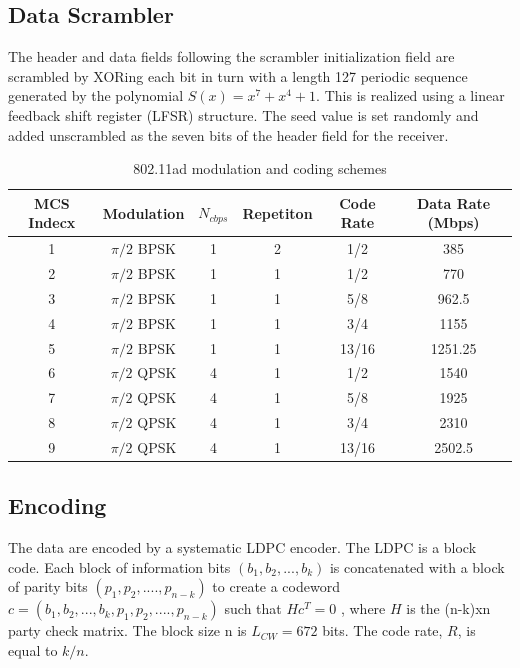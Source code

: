 \documentclass[conference]{IEEEtran}
\begin{document}
\subsection{Data Scrambler} 
The header and data fields following the scrambler initialization field are scrambled by XORing each bit in turn with a length 127 periodic sequence generated by the polynomial
$S ( x ) = x^7 + x^4 + 1$. This is realized using a linear feedback shift register (LFSR) structure. The seed value is set randomly and added unscrambled as the seven bits of the header field for the receiver.
\begin{table}[t]
\normalsize
\caption{802.11ad modulation and coding schemes}
\label{mcs}
\centering
\begin{tabular}{@{}cccccc@{}}
\toprule
MCS Indecx & Modulation & $N_{cbps}$ & Repetiton & Code Rate & Data Rate (Mbps) \\ \midrule
1 & $\pi/2$ BPSK & 1 & 2 & 1/2 & 385 \\
2 & $\pi/2$ BPSK & 1 & 1 & 1/2 & 770 \\
3 & $\pi/2$ BPSK & 1 & 1 & 5/8 & 962.5 \\
4 & $\pi/2$ BPSK & 1 & 1 & 3/4 & 1155 \\
5 & $\pi/2$ BPSK & 1 & 1 & 13/16 & 1251.25 \\
6 & $\pi/2$ QPSK & 4 & 1 & 1/2 & 1540 \\
7 & $\pi/2$ QPSK & 4 & 1 & 5/8 & 1925 \\
8 & $\pi/2$ QPSK & 4 & 1 & 3/4 & 2310 \\
9 & $\pi/2$ QPSK & 4 & 1 & 13/16 & 2502.5 \\ \bottomrule
\end{tabular}
\end{table}
\subsection{Encoding}
The data are encoded by a systematic LDPC encoder. The LDPC is a block code. Each block of information
bits $(b_1 , b_2 ,...,b_k )$ is concatenated with a block of parity bits $(p_1 ,p_2 ,....,p_{n-k} )$ to create a codeword $c =( b_1 ,b_2 ,...,b_k ,p_1 ,p_2 ,....,p_{ n-k} )$ such that $Hc^T = 0$ , where $H$ is the (n-k)xn party check matrix. The block size n is $L_{CW}= 672$ bits. The code rate, $R$, is equal to $k/n$. 
\end{document}
